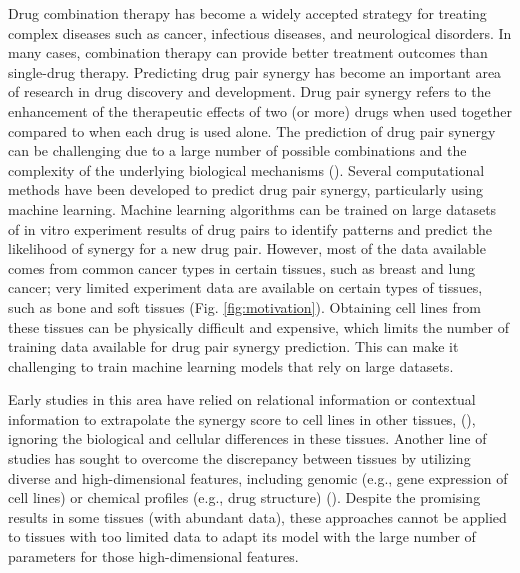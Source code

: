 Drug combination therapy has become a widely accepted strategy for treating complex diseases such as cancer, infectious diseases, and neurological disorders. In many cases, combination therapy can provide better treatment outcomes than single-drug therapy. Predicting drug pair synergy has become an important area of research in drug discovery and development. Drug pair synergy refers to the enhancement of the therapeutic effects of two (or more) drugs when used together compared to when each drug is used alone. The prediction of drug pair synergy can be challenging due to a large number of possible combinations and the complexity of the underlying biological mechanisms (\cite{zagidullin_drugcomb_2019}). Several computational methods have been developed to predict drug pair synergy, particularly using machine learning. Machine learning algorithms can be trained on large datasets of in vitro experiment results of drug pairs to identify patterns and predict the likelihood of synergy for a new drug pair. However, most of the data available comes from common cancer types in certain tissues, such as breast and lung cancer; very limited experiment data are available on certain types of tissues, such as bone and soft tissues (Fig. \ref{fig:motivation}). Obtaining cell lines from these tissues can be physically difficult and expensive, which limits the number of training data available for drug pair synergy prediction. This can make it challenging to train machine learning models that rely on large datasets. 

Early studies in this area have relied on relational information or contextual information to extrapolate the synergy score to cell lines in other tissues, (\cite{chen_drugcom_2018, 10.1093/bioinformatics/btaa287, li_network_2018, kuru_matchmaker_2022, 10.1093/bioinformatics/btac579}), ignoring the biological and cellular differences in these tissues. Another line of studies has sought to overcome the discrepancy between tissues by utilizing diverse and high-dimensional features, including genomic (e.g., gene expression of cell lines) or chemical profiles (e.g., drug structure) (\cite{preuer_deepsynergy_2018, liu_transynergy_2021, kuru_matchmaker_2022, hosseini_ccsynergy_2023, kim_anticancer_2021}). Despite the promising results in some tissues (with abundant data), these approaches cannot be applied to tissues with too limited data to adapt its model with the large number of parameters for those high-dimensional features. 

